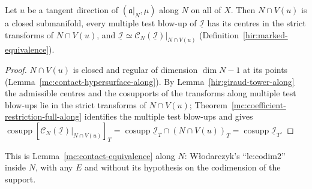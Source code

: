 \begin{lemma}
\label{mc:contact-equivalence-along}
\leanok
Let \(u\) be a tangent direction of \((\mathfrak a|_N,\mu)\) along \(N\) on all of \(X\). Then \(N\cap V(u)\) is a closed submanifold, every multiple test blow-up of
\(\underline{\mathcal I}\) has its centres in the strict transforms of \(N\cap V(u)\), and \(\underline{\mathcal I}\simeq\mathcal C_N(\underline{\mathcal I})|_{N\cap V(u)}\)
(Definition~\ref{hir:marked-equivalence}).
\end{lemma}
\begin{proof}
\leanok
\(N\cap V(u)\) is closed and regular of dimension \(\dim N-1\) at its points (Lemma~\ref{mc:contact-hypersurface-along}). By Lemma~\ref{hir:giraud-tower-along} the admissible centres
and the cosupports of the transforms along multiple test blow-ups lie in the strict transforms of \(N\cap V(u)\); Theorem~\ref{mc:coefficient-restriction-full-along}
identifies the multiple test blow-ups and gives \(\operatorname{cosupp}[\mathcal C_N(\underline{\mathcal I})|_{N\cap V(u)}]_T=\operatorname{cosupp}\underline{\mathcal I}_T\cap(N\cap V(u))_T=\operatorname{cosupp}\underline{\mathcal I}_T\).
\end{proof}
This is Lemma~\ref{mc:contact-equivalence} along \(N\): Włodarczyk's ``le:codim2'' inside \(N\), with any \(E\) and without its hypothesis on the codimension of the support.

